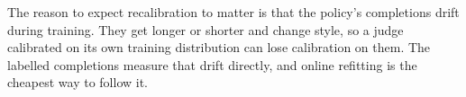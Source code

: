 The reason to expect recalibration to matter is that the policy's completions drift during training. They get longer
or shorter and change style, so a judge calibrated on its own training distribution can lose calibration on them. The
labelled completions measure that drift directly, and online refitting is the cheapest way to follow it.
